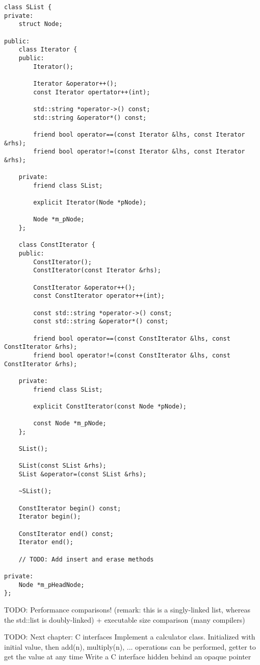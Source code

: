 \begin{lstlisting}[frame=single, caption={SList.h}]
class SList {
private:
    struct Node;

public:
    class Iterator {
    public:
        Iterator();
        
        Iterator &operator++();
        const Iterator opertator++(int);
        
        std::string *operator->() const;
        std::string &operator*() const;
    
        friend bool operator==(const Iterator &lhs, const Iterator &rhs);
        friend bool operator!=(const Iterator &lhs, const Iterator &rhs);
        
    private:
        friend class SList;
        
        explicit Iterator(Node *pNode);
        
        Node *m_pNode;
    };

    class ConstIterator {
    public:            
        ConstIterator();
        ConstIterator(const Iterator &rhs);
        
        ConstIterator &operator++();
        const ConstIterator operator++(int);
        
        const std::string *operator->() const;
        const std::string &operator*() const;
        
        friend bool operator==(const ConstIterator &lhs, const ConstIterator &rhs);
        friend bool operator!=(const ConstIterator &lhs, const ConstIterator &rhs);
        
    private:
        friend class SList;
    
        explicit ConstIterator(const Node *pNode);
    
        const Node *m_pNode;
    };

    SList();
    
    SList(const SList &rhs);
    SList &operator=(const SList &rhs);
    
    ~SList();
    
    ConstIterator begin() const;
    Iterator begin();

    ConstIterator end() const;
    Iterator end();
    
    // TODO: Add insert and erase methods

private:
    Node *m_pHeadNode;
};
\end{lstlisting}


TODO: Performance comparisons! (remark: this is a singly-linked list, whereas the std::list
is doubly-linked) + executable size comparison (many compilers)

TODO: Next chapter: C interfaces
Implement a calculator class. Initialized with initial value, then add(n), multiply(n), ... operations can be performed, getter to get the value at any time
Write a C interface hidden behind an opaque pointer

